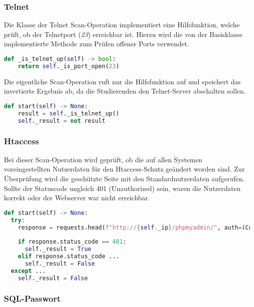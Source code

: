 \subsubsection{Telnet}
Die Klasse der Telnet Scan-Operation implementiert eine Hilfsfunktion, welche prüft, ob der Telnetport (\textit{23}) erreichbar ist. Hierzu wird die von der Basisklasse implementierte Methode zum Prüfen offener Ports verwendet.

\begin{lstlisting}[language=Python, frame=single, caption={Big Brother Telnet}, captionpos=b, label={lst:bigbrother-telnet}]
def _is_telnet_up(self) -> bool:
	return self._is_port_open(23)
\end{lstlisting}

Die eigentliche Scan-Operation ruft nur die Hilfsfunktion auf und speichert das invertierte Ergebnis ab, da die Studierenden den Telnet-Server abschalten sollen.

\begin{lstlisting}[language=Python, frame=single, caption={Big Brother Telnet}, captionpos=b, label={lst:bigbrother-telnet-start}]
def start(self) -> None:
	result = self._is_telnet_up()
	self._result = not result
\end{lstlisting}

\subsubsection{Htaccess}

Bei dieser Scan-Operation wird geprüft, ob die auf allen Systemen voreingestellten Nutzerdaten für den Htaccess-Schutz geändert worden sind. Zur Überprüfung wird die geschützte Seite mit den Standardnutzerdaten aufgerufen. Sollte der Statuscode ungleich 401 (Unauthorized) sein, waren die Nutzerdaten korrekt oder der Webserver war nicht erreichbar.
\begin{lstlisting}[language=Python, frame=single, caption={Big Brother Htaccess}, captionpos=b, label={lst:bigbrother-htaccess}]
def start(self) -> None:
  try:
    response = requests.head(f"http://{self._ip}/phpmyadmin/", auth=(Config.operations['htaccess']['username'], Config.operations['htaccess']['password']))
    
    if response.status_code == 401:
      self._result = True
    elif response.status_code ...
      self._result = False
  except ...
    self._result = False
\end{lstlisting}

\subsubsection{SQL-Passwort}

